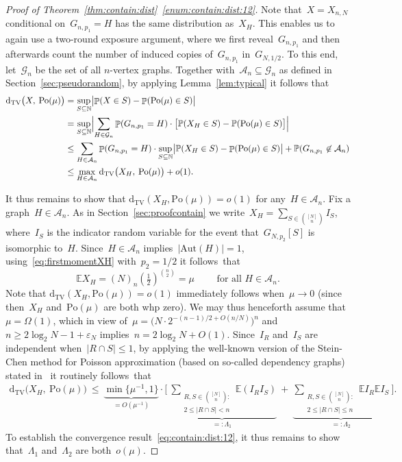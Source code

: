 \documentclass{article}
\newcommand{\eps}{\varepsilon}
\renewcommand{\Pr}{\mathbb{P}}
\newcommand{\E}{\mathbb{E}}
\newcommand{\cA}{\mathcal{A}}
\newcommand{\cG}{\mathcal{G}}
\newcommand{\TV}{\mathrm{d}_{\mathrm{TV}}}
\newcommand\lrpar[1]{\left(#1\right)}
\newcommand{\Aut}{\mathrm{Aut}}
\DeclareMathOperator{\pr}{\mathbb{P}}
\newcommand\bigpar[1]{\bigl(#1\bigr)}
\newcommand\bigsqpar[1]{\bigl[#1\bigr]}
\newcommand\Biggsqpar[1]{\Biggl[#1\Biggr]}
\newcommand\bigcpar[1]{\bigl\{#1\bigr\}}
\newcommand\bigabs[1]{\bigl|#1\bigr|}
\newcommand\Bigabs[1]{\Bigl|#1\Bigr|}
\newcommand{\refT}[1]{Theorem~\ref{#1}}
\newcommand{\refL}[1]{Lemma~\ref{#1}}
\newcommand{\refS}[1]{Section~\ref{#1}}
\newcommand\Po{\mathrm{Po}}
\begin{document}
\begin{proof}[Proof of \refT{thm:contain:dist}~\ref{enum:contain:dist:12}]
Note that~$X=X_{n,N}$ conditional on~$G_{n,p_1}=H$ has the same distribution as~$X_H$. 
This enables us to again use a two-round exposure argument, where we first reveal~$G_{n,p_1}$ and then afterwards count the number of induced copies of~$G_{n,p_1}$ in~$G_{N,1/2}$.
To this end, let~$\cG_{n}$ be the set of all $n$-vertex graphs. 
Together with~$\cA_n \subseteq \cG_n$ as defined in \refS{sec:pseudorandom}, 
by applying \refL{lem:typical} it follows that 
\begin{align*}
\TV\bigpar{X, \: \Po(\mu)}
&= \sup_{S \subseteq \mathbb{N}}\bigabs{\pr(X\in S)-\pr(\Po(\mu)\in S)}\\ 
&= \sup_{S \subseteq \mathbb{N}}\Bigabs{\sum_{H\in \cG_n}\pr(G_{n,p_1}=H) \cdot \bigsqpar{\Pr(X_H\in S)-\Pr(\Po(\mu)\in S)}}  \\
&\le \sum_{H\in \cA_n}\pr(G_{n,p_1}=H) \cdot \sup_{S \subseteq \mathbb{N}}\bigabs{\Pr(X_H\in S)-\pr(\Po(\mu)\in S)} + \Pr(G_{n,p_1}\not \in \cA_n)\\ 
& \le \max_{H\in \cA_n}\TV\bigpar{X_H, \: \Po(\mu)} + o(1). 
\end{align*}

It thus remains to show that $\TV(X_H,\Po(\mu))=o(1)$ for any~$H \in \cA_n$. Fix a graph~$H \in \cA_n$. As in \refS{sec:proofcontain} we write~$X_H=\sum_{S\in \binom{[N]}{n}} I_S$, where~$I_S$ is the indicator random variable for the event that~$G_{N,p_2}[S]$ is isomorphic to~$H$. 
Since~$H \in \cA_n$ implies~$|\Aut(H)|=1$, using~\eqref{eq:firstmomentXH} with~$p_2=1/2$ it follows~that 
\begin{equation}\label{def:mu}
\E X_H = (N)_n \lrpar{\tfrac{1}{2}}^{\binom{n}{2}} = \mu \qquad \text{ for all~$H \in \cA_n$} .
\end{equation}
Note that $\TV(X_H,\Po(\mu))=o(1)$ immediately follows when~$\mu \to 0$  (since then~$X_H$ and~$\Po(\mu)$ are both whp zero). 
We may thus henceforth assume that~$\mu =\Omega(1)$, which in view of~$\mu =\bigpar{N \cdot 2^{-(n-1)/2+O(n/N)} }^{n}$ and~${n \ge 2\log_2 N-1+\eps_N}$ implies~$n=2\log_2N + O(1)$. 
Since~$I_R$ and~$I_S$ are independent when~${|R \cap S| \le 1}$, 
by applying the well-known version of the Stein-Chen method for Poisson approximation 
(based on so-called dependency graphs) 
stated in~\mbox{\cite[Theorem~6.23]{JLR}}  
it routinely follows~that
\begin{align}\label{def:Lambdai}
    \TV\bigpar{X_H, \: \Po(\mu)} \: \le \: 
   \underbrace{\min\bigcpar{\mu^{-1},1}}_{= O(\mu^{-1})} \cdot \Biggsqpar{ \underbrace{\: \sum_{\substack{R,S \in \binom{[N]}{n}:\\ 2 \le |R \cap S| < n}}\E(I_R I_S)}_{=:\Lambda_1} \ + \  \underbrace{\sum_{\substack{R,S \in \binom{[N]}{n}:\\ 2 \le |R \cap S| \le n}} \E I_R \E I_S}_{=: \Lambda_2} \: } . 
\end{align}
To establish the convergence result~\eqref{eq:contain:dist:12}, 
it thus remains to show that~$\Lambda_1$ and~$\Lambda_2$ are both~$o(\mu)$.



\end{proof}
\end{document}

